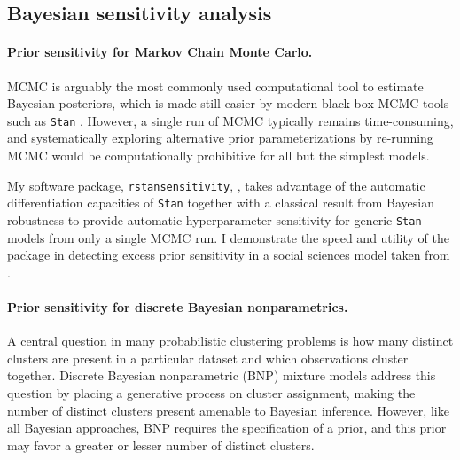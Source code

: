\clearpage
\subsection*{Bayesian sensitivity analysis}

\paragraph{Prior sensitivity for Markov Chain Monte Carlo.}
%
MCMC is arguably the most commonly used computational tool to estimate Bayesian
posteriors, which is made still easier by modern black-box MCMC tools such as
\texttt{Stan} \citep{carpenter:2017:stan, rstan}.  However, a single run of MCMC
typically remains time-consuming, and systematically exploring alternative prior
parameterizations by re-running MCMC would be computationally prohibitive for
all but the simplest models.

My software package, \texttt{rstansensitivity},
\citep{giordano:2020:rstansensitivity, giordano:2018:mcmchyper}, takes advantage
of the automatic differentiation capacities of \texttt{Stan}
\citep{carpenter:2015:stanmath} together with a classical result from  Bayesian
robustness \citep{gustafson:1996:localposterior, basu:1996:local,
giordano:2018:covariances} to provide automatic hyperparameter sensitivity for
generic \texttt{Stan} models from only a single MCMC run.  I demonstrate the
speed and utility of the package in detecting excess prior sensitivity in a
social sciences model taken from \citet[Chapter 13.5]{gelman:2006:arm}.


\paragraph{Prior sensitivity for discrete Bayesian nonparametrics.}
%
A central question in many probabilistic clustering problems is how many
distinct clusters are present in a particular dataset and which observations
cluster together. Discrete Bayesian nonparametric (BNP) mixture models address
this question by placing a generative process on cluster assignment, making the
number of distinct clusters present amenable to Bayesian inference.  However,
like all Bayesian approaches, BNP requires the specification of a prior, and
this prior may favor a greater or lesser number of distinct clusters.


